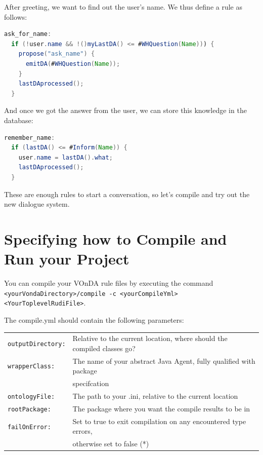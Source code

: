 \documentclass[a4paper]{report}
\newcommand{\vonda}{VOnDA\xspace}
\begin{document}
After greeting, we want to find out the user's name. We thus define a rule as
follows:

\begin{lstlisting}[language=Java]
ask_for_name:
  if (!user.name && !()myLastDA() <= #WHQuestion(Name))) {
    propose("ask_name") {
      emitDA(#WHQuestion(Name));
    }
    lastDAprocessed();
  }
\end{lstlisting}

And once we got the answer from the user, we can store this knowledge in the database:

\begin{lstlisting}[language=Java]
remember_name:
  if (lastDA() <= #Inform(Name)) {
    user.name = lastDA().what;
    lastDAprocessed();
  }
\end{lstlisting}

These are enough rules to start a conversation, so let's compile and try out
the new dialogue system.

\section{Specifying how to Compile and Run your Project}

You can compile your \vonda rule files by executing the command\\ \verb|<yourVondaDirectory>/compile -c <yourCompileYml> <YourToplevelRudiFile>|.

The compile.yml should contain the following parameters:\\

\begin{tabular}{ll}
	\verb|outputDirectory:| & Relative to the current location, where should the compiled classes go?\\
	\verb|wrapperClass:| & The name of your abstract Java Agent, fully qualified with package \\&specifcation\\
	\verb|ontologyFile:| &The path to your .ini, relative to the current location\\
	\verb|rootPackage:| &The package where you want the compile results to be in\\
	\verb|failOnError:| &Set to true to exit compilation on any encountered type errors,\\& otherwise set to false (*)\\
\end{tabular}\newline
\end{document}
